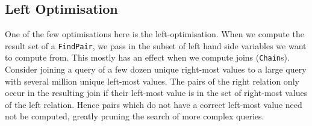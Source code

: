 \documentclass[12pt,a4paper,twoside,openright]{report}
\newcommand\codeName[1]{\texttt{#1}}
\begin{document}
	\subsection{Left Optimisation}\label{leftOpt}
	One of the few optimisations here is the left-optimisation. When we compute the result set of a \codeName{FindPair}, we pass in the subset of left hand side variables we want to compute from. This mostly has an effect when we compute joins (\codeName{Chain}s). Consider joining a query of a few dozen unique right-most values to a large query with several million unique left-most values. The pairs of the right relation only occur in the resulting join if their left-most value is in the set of right-most values of the left relation. Hence pairs which do not have a correct left-most value need not be computed, greatly pruning the search of more complex queries.
\end{document}
